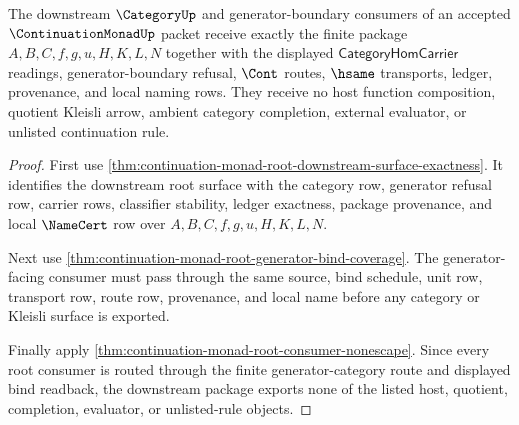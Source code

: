 \begin{theorem}
\label{thm:continuation-monad-root-downstream-generator-package}
The downstream $\CategoryUp$ and generator-boundary consumers of an accepted $\ContinuationMonadUp$ packet receive exactly the finite package $A,B,C,f,g,u,H,K,L,N$ together with the displayed $\mathsf{CategoryHomCarrier}$ readings, generator-boundary refusal, $\Cont$ routes, $\hsame$ transports, ledger, provenance, and local naming rows. They receive no host function composition, quotient Kleisli arrow, ambient category completion, external evaluator, or unlisted continuation rule.
\end{theorem}
\begin{proof}
First use \autoref{thm:continuation-monad-root-downstream-surface-exactness}. It identifies the downstream root surface with the category row, generator refusal row, carrier rows, classifier stability, ledger exactness, package provenance, and local $\NameCert$ row over $A,B,C,f,g,u,H,K,L,N$.

Next use \autoref{thm:continuation-monad-root-generator-bind-coverage}. The generator-facing consumer must pass through the same source, bind schedule, unit row, transport row, route row, provenance, and local name before any category or Kleisli surface is exported.

Finally apply \autoref{thm:continuation-monad-root-consumer-nonescape}. Since every root consumer is routed through the finite generator-category route and displayed bind readback, the downstream package exports none of the listed host, quotient, completion, evaluator, or unlisted-rule objects.
\end{proof}

